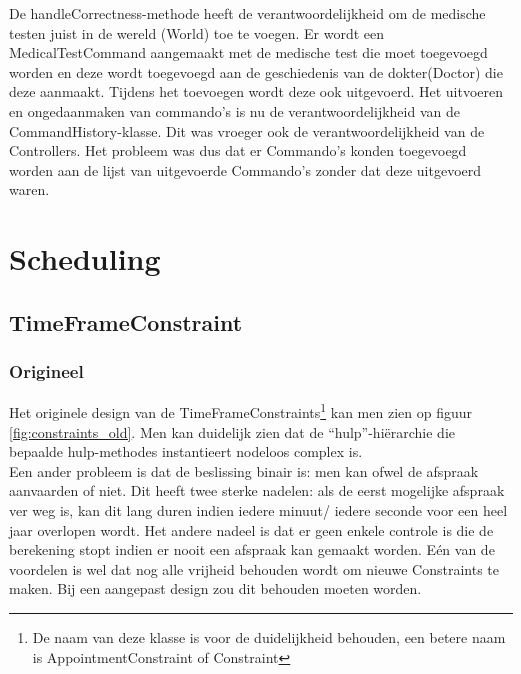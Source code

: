 De handleCorrectness-methode heeft de verantwoordelijkheid om de medische testen juist in de wereld (World) toe te voegen. 
Er wordt een MedicalTestCommand aangemaakt met de medische test die moet toegevoegd worden en deze wordt toegevoegd aan de geschiedenis van de dokter(Doctor) die deze aanmaakt. 
Tijdens het toevoegen wordt deze ook uitgevoerd. 
Het uitvoeren en ongedaanmaken van commando's is nu de verantwoordelijkheid van de CommandHistory-klasse.
Dit was vroeger ook de verantwoordelijkheid van de Controllers. 
Het probleem was dus dat er Commando's konden toegevoegd worden aan de lijst van uitgevoerde Commando's zonder dat deze uitgevoerd waren.


\section{Scheduling\label{scheduling}}
\subsection{TimeFrameConstraint}
\subsubsection{Origineel}
Het originele design van de TimeFrameConstraints\footnote{De naam van deze klasse is voor de duidelijkheid behouden, een betere naam is AppointmentConstraint of Constraint} kan men zien op figuur \ref{fig:constraints_old}. 
Men kan duidelijk zien dat de ``hulp''-hiërarchie die bepaalde hulp-methodes instantieert nodeloos complex is.\\

Een ander probleem is dat de beslissing binair is: men kan ofwel de afspraak aanvaarden of niet.
Dit heeft twee sterke nadelen: als de eerst mogelijke afspraak ver weg is, kan dit lang duren indien iedere minuut/ iedere seconde voor een heel jaar overlopen wordt. 
Het andere nadeel is dat er geen enkele controle is die de berekening stopt indien er nooit een afspraak kan gemaakt worden. 
Eén van de voordelen is wel dat nog alle vrijheid behouden wordt om nieuwe Constraints te maken. 
Bij een aangepast design zou dit behouden moeten worden.

